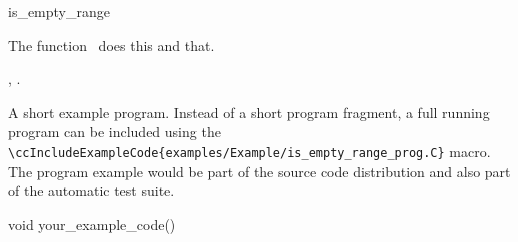 

\begin{ccRefFunction}{is_empty_range}  %


\ccDefinition
  
The function \ccRefName\ does this and that.



\ccIsModel


\ccSeeAlso

,
.

\ccExample

A short example program.
Instead of a short program fragment, a full running program can be
included using the 
\verb|\ccIncludeExampleCode{examples/Example/is_empty_range_prog.C}| 
macro. The program example would be part of the source code distribution and
also part of the automatic test suite.

\begin{ccExampleCode}
void your_example_code() {
}
\end{ccExampleCode}


\end{ccRefFunction}


